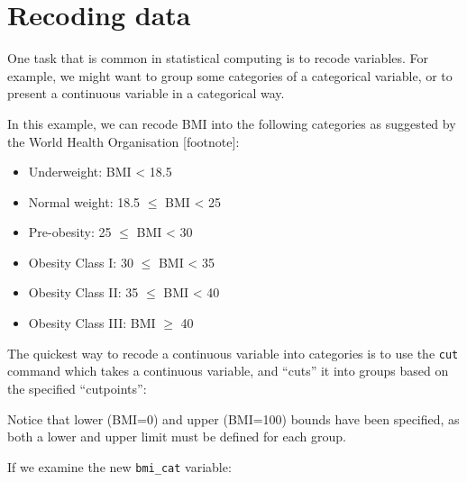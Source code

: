 \documentclass[
]{memoir}
\newenvironment{Shaded}{\begin{snugshade}}{\end{snugshade}}
\newcommand{\DecValTok}[1]{\textcolor[rgb]{0.00,0.00,0.81}{#1}}
\newcommand{\FloatTok}[1]{\textcolor[rgb]{0.00,0.00,0.81}{#1}}
\newcommand{\FunctionTok}[1]{\textcolor[rgb]{0.00,0.00,0.00}{#1}}
\newcommand{\NormalTok}[1]{#1}
\newcommand{\OtherTok}[1]{\textcolor[rgb]{0.56,0.35,0.01}{#1}}
\newcommand{\SpecialCharTok}[1]{\textcolor[rgb]{0.00,0.00,0.00}{#1}}
\providecommand{\tightlist}{%
  \setlength{\itemsep}{0pt}\setlength{\parskip}{0pt}}
\begin{document}
\hypertarget{recoding-data}{%
\section{Recoding data}\label{recoding-data}}

One task that is common in statistical computing is to recode variables. For example, we might want to group some categories of a categorical variable, or to present a continuous variable in a categorical way.

In this example, we can recode BMI into the following categories as suggested by the World Health Organisation {[}footnote{]}:

\begin{itemize}
\tightlist
\item
  Underweight: BMI \textless{} 18.5
\item
  Normal weight: 18.5 \(\le\) BMI \textless{} 25
\item
  Pre-obesity: 25 \(\le\) BMI \textless{} 30
\item
  Obesity Class I: 30 \(\le\) BMI \textless{} 35
\item
  Obesity Class II: 35 \(\le\) BMI \textless{} 40
\item
  Obesity Class III: BMI \(\ge\) 40
\end{itemize}

The quickest way to recode a continuous variable into categories is to use the \texttt{cut} command which takes a continuous variable, and ``cuts'' it into groups based on the specified ``cutpoints'':

\begin{Shaded}
\end{Shaded}

Notice that lower (BMI=0) and upper (BMI=100) bounds have been specified, as both a lower and upper limit must be defined for each group.

If we examine the new \texttt{bmi\_cat} variable:

\begin{Shaded}
\end{Shaded}
\end{document}
